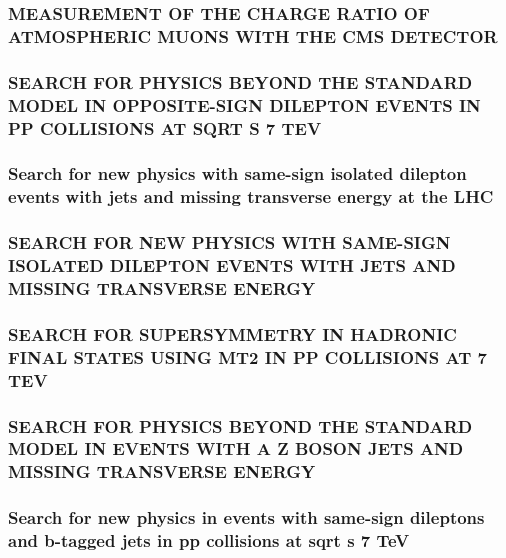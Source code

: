 \documentclass[a4paper, 11pt, twoside, openright]{report}
\begin{document}
\subsubsection{MEASUREMENT OF THE CHARGE RATIO OF ATMOSPHERIC MUONS WITH THE CMS DETECTOR}

\subsubsection{SEARCH FOR PHYSICS BEYOND THE STANDARD MODEL IN OPPOSITE-SIGN DILEPTON EVENTS IN PP COLLISIONS AT SQRT S 7 TEV}

\subsubsection{Search for new physics with same-sign isolated dilepton events with jets and missing transverse energy at the LHC}

\subsubsection{SEARCH FOR NEW PHYSICS WITH SAME-SIGN ISOLATED DILEPTON EVENTS WITH JETS AND MISSING TRANSVERSE ENERGY}

\subsubsection{SEARCH FOR SUPERSYMMETRY IN HADRONIC FINAL STATES USING MT2 IN PP COLLISIONS AT 7 TEV}

\subsubsection{SEARCH FOR PHYSICS BEYOND THE STANDARD MODEL IN EVENTS WITH A Z BOSON JETS AND MISSING TRANSVERSE ENERGY}

\subsubsection{Search for new physics in events with same-sign dileptons and b-tagged jets in pp collisions at sqrt s 7 TeV}

\end{document}
